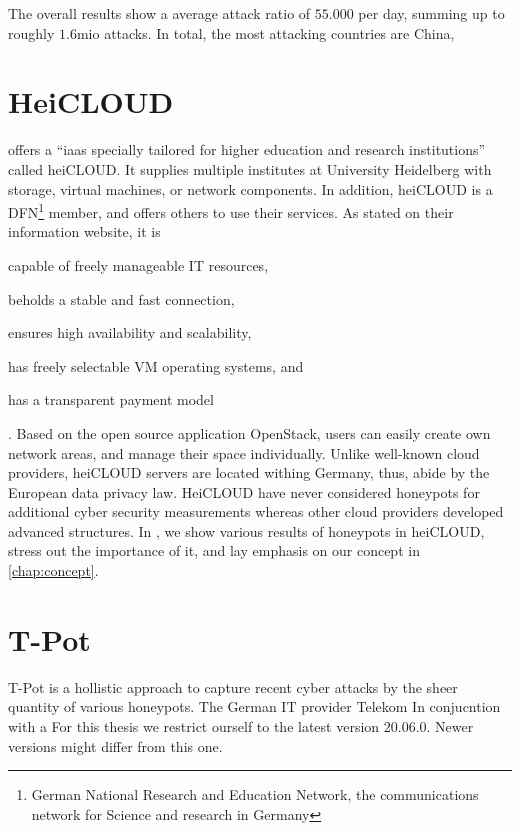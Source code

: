 The overall results show a average attack ratio of $55.000$ per day, summing up to roughly $1.6$mio attacks. 
In total, the most attacking countries are China, 

\section{HeiCLOUD}

\citet{urz2021} offers a \enquote{\ac{iaas} specially tailored for higher education and research institutions} called heiCLOUD.
It supplies multiple institutes at University Heidelberg with storage, virtual machines, or network components.
In addition, heiCLOUD is a DFN\footnote{German National Research and Education Network,  the communications network for Science and research in Germany} member, and offers others to use their services.
As stated on their information website\cite{heicloud2021}, it is
\begin{enumerate*}[label=(\roman*)]
    \item capable of freely manageable IT resources,
    \item beholds a stable and fast connection,
    \item ensures high availability and scalability,
    \item has freely selectable VM operating systems, and
    \item has a transparent payment model
\end{enumerate*} \cite{heicloud2021}.
Based on the open source application OpenStack, users can easily create own network areas, and manage their space individually.
Unlike well-known cloud providers, heiCLOUD servers are located withing Germany, thus, abide by the European data privacy law.
HeiCLOUD have never considered honeypots for additional cyber security measurements whereas other cloud providers developed advanced structures.
In , we show various results of honeypots in heiCLOUD, stress out the importance of it, and lay emphasis on our concept in \autoref{chap:concept}.

\section{T-Pot}
\label{sec:tpot}

T-Pot is a hollistic approach to capture recent cyber attacks by the sheer quantity of various honeypots.
The German IT provider Telekom
In conjucntion with a
For this thesis we restrict ourself to the latest version 20.06.0. Newer versions might differ from this one.


